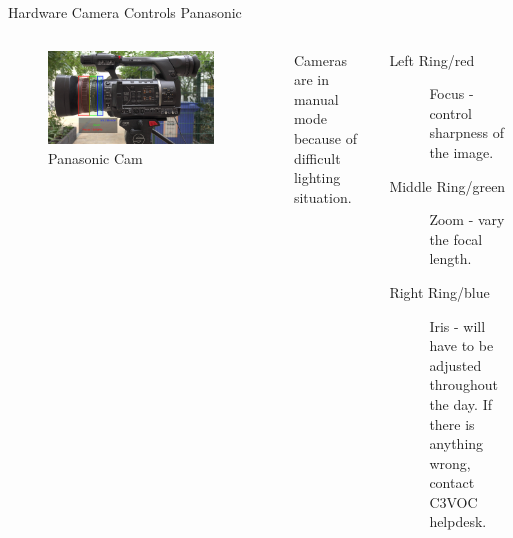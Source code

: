 
\begin{frame}{Hardware Camera Controls Panasonic}
	\begin{columns}[T,onlytextwidth]
	\begin{figure}
		\centering
		\includegraphics[width=0.9\textwidth]{images/panasonic-side-annotated.jpg}
		\caption{Panasonic Cam}
	\end{figure}
		Cameras are in manual mode because of difficult lighting situation.
		\begin{description}
			\item[Left Ring/red] Focus - control sharpness of the image.
			\item[Middle Ring/green] Zoom - vary the focal length.
			\item[Right Ring/blue] Iris - will have to be adjusted throughout the day. If there is anything wrong, contact C3VOC helpdesk.
		\end{description}
	\end{columns}
\end{frame}

